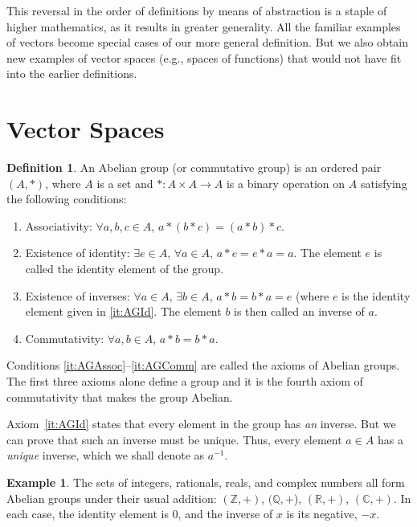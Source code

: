 \documentclass[svgnames]{article}
\theoremstyle{definition}
\newtheorem{Definition}[Theorem]{Definition}
\newtheorem{Example}[Theorem]{Example}
\theoremstyle{remark}
\newcommand{\newterm}[1]{{\color{alertcolor} #1}}
\begin{document}
This reversal in the order of definitions by means of abstraction is a staple of higher mathematics, as it results in greater generality. All the familiar examples of vectors become special cases of our more general definition. But we also obtain new examples of vector spaces (e.g., spaces of functions) that would not have fit into the earlier definitions.

\section{Vector Spaces}\label{sec:VecSpac}
\begin{Definition}
An \newterm{Abelian group} (or \newterm{commutative group}) is an ordered pair $(A, *)$, where $A$ is a set and $* \colon A \times A \to A$ is a binary operation on $A$ satisfying the following conditions:
\begin{enumerate}
\item\label{it:AGAssoc} {Associativity}: $\forall a, b, c \in A$, $a*(b*c) = (a*b)*c$.
\item\label{it:AGId} {Existence of identity}: $\exists e \in A$, $\forall a \in A$, $a * e = e * a = a$. The element $e$ is called the \newterm{identity element} of the group.
\item\label{it:AGInv} {Existence of inverses}: $\forall a \in A$, $\exists b \in A$, $a * b = b * a = e$ (where $e$ is the identity element given in \ref{it:AGId}. The element $b$ is then called an \newterm{inverse} of $a$.
\item\label{it:AGComm} {Commutativity}: $\forall a, b \in A$, $a * b = b * a$.
\end{enumerate}
\end{Definition}
Conditions \ref{it:AGAssoc}--\ref{it:AGComm} are called the axioms of Abelian groups. The first three axioms alone define a \newterm{group} and it is the fourth axiom of commutativity that makes the group Abelian.

Axiom~\ref{it:AGId} states that every element in the group has \emph{an} inverse. But we can prove that such an inverse must be unique. Thus, every element $a \in A$ has a \emph{unique} inverse, which we shall denote as $a^{-1}$.

\begin{Example}\label{ex:AbGrpZQRC+}
The sets of integers, rationals, reals, and complex numbers all form Abelian groups under their usual addition: $(\mathbb Z, +)$, $(\mathbb Q, +$), $(\mathbb R, +)$, $(\mathbb C, +)$. In each case, the identity element is $0$, and the inverse of $x$ is its negative, $-x$.
\end{Example}
\end{document}
